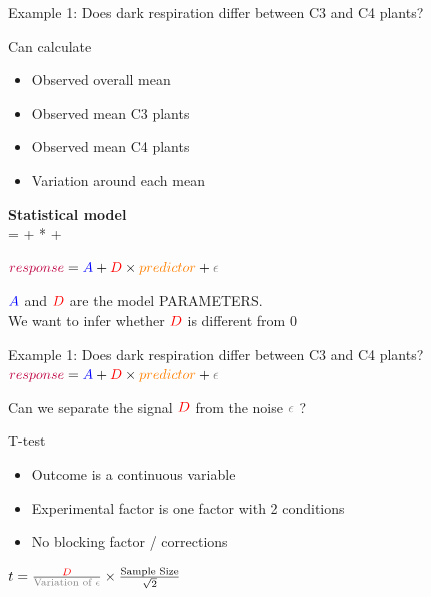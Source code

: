 \documentclass[10pt]{beamer}
\begin{document}
\begin{frame}{Example 1: Does dark respiration differ between C3 and C4 plants?}

    \begin{block}{Can calculate}
 \begin{itemize}
  \item Observed overall mean
  \item Observed mean C3 plants
  \item Observed mean C4 plants
  \item Variation around each mean
 \end{itemize}
\end{block}

\textbf{Statistical model}\\
 {\color{purple}{Respiration}} = {\color{blue}{Mean for C3}} + {\color{red}{Difference C4-C3}} * {\color{orange}{(is C4?)}} + {\color{gray}{Noise}}\\
 \pause

${\color{purple}{response}} = {\color{blue}{A}} + {\color{red}{D}} \times {\color{orange}{predictor}} + {\color{gray}{\epsilon}}$

 ${\color{blue}{A}} $ and ${\color{red}{D}}$ are the model PARAMETERS. \\
 We want to infer whether ${\color{red}{D}}$ is different from 0

\end{frame}

\begin{frame}{Example 1: Does dark respiration differ between C3 and C4 plants?}
${\color{purple}{response}} = {\color{blue}{A}} + {\color{red}{D}} \times {\color{orange}{predictor}} + {\color{gray}{\epsilon}}$

  Can we separate the signal ${\color{red}{D}}$ from the noise ${\color{gray}{\epsilon}}$ ?

 \pause
 
 \begin{block}{T-test}
  \begin{itemize}
   \item Outcome is a continuous variable
   \item Experimental factor is one factor with 2 conditions
   \item No blocking factor / corrections
  \end{itemize}
 \end{block}
 
 \pause
 
 $ t = \frac{\color{red}{D}}{\text{\color{gray}{Variation of }}\color{gray}{\epsilon}} \times \frac{\text{Sample Size}}{\sqrt{2}}$

\end{frame}
\end{document}
